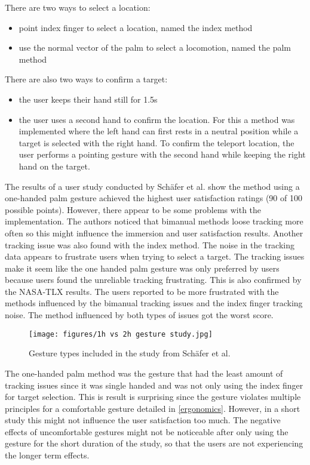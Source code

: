 There are two ways to select a location:
\begin{itemize}
  \item point index finger to select a location, named the index method
  \item use the normal vector of the palm to select a locomotion, named the palm method
\end{itemize}

There are also two ways to confirm a target:
\begin{itemize}
  \item the user keeps their hand still for 1.5s
  \item the user uses a second hand to confirm the location. For this a method was implemented where the left hand can first rests in a neutral position while a target is selected with the right hand. To confirm the teleport location, the user performs a pointing gesture with the second hand while keeping the right hand on the target.
\end{itemize}

The results of a user study conducted by Schäfer et al. \cite{Schafer2021} show the method using a one-handed palm gesture achieved the highest user satisfaction ratings (90 of 100 possible points). However, there appear to be some problems with the implementation. The authors noticed that bimanual methods loose tracking more often so this might influence the immersion and user satisfaction results. Another tracking issue was also found with the index method. The noise in the tracking data appears to frustrate users when trying to select a target. The tracking issues make it seem like the one handed palm gesture was only preferred by users because users found the unreliable tracking frustrating. This is also confirmed by the NASA-TLX results. The users reported to be more frustrated with the methods influenced by the bimanual tracking issues and the index finger tracking noise. The method influenced by both types of issues got the worst score. 

\begin{figure}[hbt!]
  \centering
  \texttt{[image: figures/1h vs 2h gesture study.jpg]}
  \caption{Gesture types included in the study from Schäfer et al. \cite{Schafer2021}}
  \label{fig:1vs2}
\end{figure}

The one-handed palm method was the gesture that had the least amount of tracking issues since it was single handed and was not only using the index finger for target selection. This is result is surprising since the gesture violates multiple principles for a comfortable gesture detailed in \ref{ergonomics}. However, in a short study this might not influence the user satisfaction too much. The negative effects of uncomfortable gestures might not be noticeable after only using the gesture for the short duration of the study, so that the users are not experiencing the longer term effects. 

